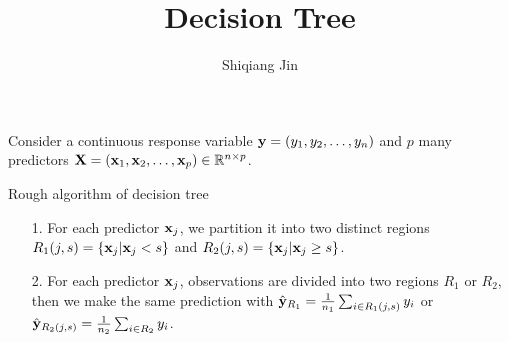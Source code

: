 \documentclass{article}
\title{\LARGE\bf Decision Tree}
\author{Shiqiang Jin}
\newcommand\ux{{\bf x}}
\newcommand\uX{{\bf X}}
\newcommand\uy{{\bf y}}
\begin{document}
\maketitle

Consider a continuous response variable $\uy=(y_1,y_2, \ldots, y_n)$ and $p$ many predictors $\uX = (\ux_1,\ux_2,\ldots,\ux_p)\in \mathbb{R}^{n\times p}$.

\begin{algorithm}
  \caption{Rough algorithm of decision tree}
\begin{itemize}
  \item [1. ] For each predictor $\ux_j$, we partition it into two distinct regions $R_1(j,s) = \{\ux_j|\ux_j<s\} $ and $R_2(j,s) = \{\ux_j|\ux_j\geq s\}$.
  \item [2. ] For each predictor $\ux_j$, observations are divided into two regions $R_1$ or $R_2$, then we make the same prediction with $\hat\uy_{R_1}=\frac{1}{n_1}\sum_{i\in R_1(j,s)} y_i$ or $\hat\uy_{R_2(j,s)}=\frac{1}{n_2}\sum_{i\in R_2} y_i$.
\end{itemize}
\end{algorithm}
\end{document}
